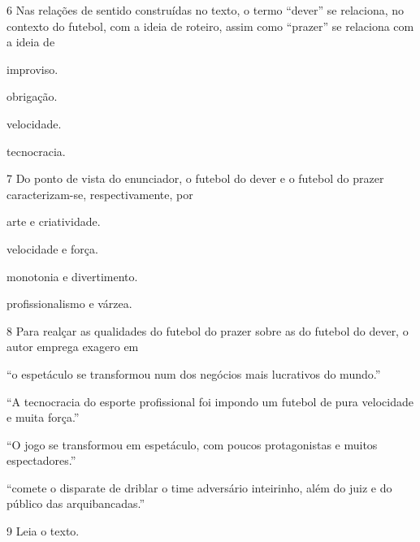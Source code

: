 \num{6} Nas relações de sentido construídas no texto, o termo ``dever'' se
relaciona, no contexto do futebol, com a ideia de roteiro, assim como
``prazer'' se relaciona com a ideia de

\begin{escolha}
\item improviso.

\item obrigação.

\item velocidade.

\item tecnocracia.
\end{escolha}

\num{7} Do ponto de vista do enunciador, o futebol do dever e o futebol do prazer
caracterizam-se, respectivamente, por

\begin{escolha}
\item arte e criatividade.

\item velocidade e força.

\item monotonia e divertimento.

\item profissionalismo e várzea.
\end{escolha}

\num{8} Para realçar as qualidades do futebol do prazer sobre as do futebol do
dever, o autor emprega exagero em

\begin{escolha}
\item ``o espetáculo se transformou num dos negócios mais lucrativos do
mundo.''

\item ``A tecnocracia do esporte profissional foi impondo um futebol de
pura velocidade e muita força.''

\item ``O jogo se transformou em espetáculo, com poucos protagonistas e muitos espectadores.''

\item ``comete o disparate de driblar o time adversário inteirinho, além do juiz e do público das arquibancadas.''
\end{escolha}

\num{9} Leia o texto.

